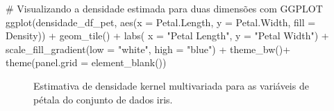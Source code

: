\documentclass[
  a4paperpaper,
]{article}
\newenvironment{Shaded}{\begin{snugshade}}{\end{snugshade}}
\newcommand{\AttributeTok}[1]{\textcolor[rgb]{0.40,0.45,0.13}{#1}}
\newcommand{\CommentTok}[1]{\textcolor[rgb]{0.37,0.37,0.37}{#1}}
\newcommand{\FunctionTok}[1]{\textcolor[rgb]{0.28,0.35,0.67}{#1}}
\newcommand{\NormalTok}[1]{\textcolor[rgb]{0.00,0.23,0.31}{#1}}
\newcommand{\SpecialCharTok}[1]{\textcolor[rgb]{0.37,0.37,0.37}{#1}}
\newcommand{\StringTok}[1]{\textcolor[rgb]{0.13,0.47,0.30}{#1}}
\begin{document}
\begin{Shaded}
\begin{Highlighting}[]
\CommentTok{\# Visualizando a densidade estimada para duas dimensões com GGPLOT}
\FunctionTok{ggplot}\NormalTok{(densidade\_df\_pet, }\FunctionTok{aes}\NormalTok{(}\AttributeTok{x =}\NormalTok{ Petal.Length, }\AttributeTok{y =}\NormalTok{ Petal.Width, }\AttributeTok{fill =}\NormalTok{ Density)) }\SpecialCharTok{+}
  \FunctionTok{geom\_tile}\NormalTok{() }\SpecialCharTok{+}
  \FunctionTok{labs}\NormalTok{( }\AttributeTok{x =} \StringTok{"Petal Length"}\NormalTok{,}
       \AttributeTok{y =} \StringTok{"Petal Width"}\NormalTok{) }\SpecialCharTok{+}
  \FunctionTok{scale\_fill\_gradient}\NormalTok{(}\AttributeTok{low =} \StringTok{"white"}\NormalTok{, }\AttributeTok{high =} \StringTok{"blue"}\NormalTok{) }\SpecialCharTok{+}
  \FunctionTok{theme\_bw}\NormalTok{()}\SpecialCharTok{+}
  \FunctionTok{theme}\NormalTok{(}\AttributeTok{panel.grid =} \FunctionTok{element\_blank}\NormalTok{())}
\end{Highlighting}
\end{Shaded}

\begin{figure}[H]


\caption{\label{fig-densidadeiris3}Estimativa de densidade kernel
multivariada para as variáveis de pétala do conjunto de dados iris.}

\end{figure}%
\end{document}
